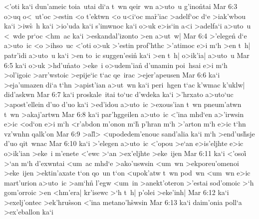 <'oti
ka`i
dun'ameic
toia~utai
di`a
t~wn
qeir~wn
a>uto~u
g'ino\r{n}tai\bibvsend
{}
\vs Mar 6:3
o>uq
o<~ut'oc
>estin
<o
t'ektwn
<o
u<i`oc
ma\r{r}'iac
>adelf`oc
d`e
>iak'wbou
ka`i
>iw\r{s}~h
ka`i
>io'uda
ka`i
s'imwnoc
ka`i
o>uk
e>is`in
a<i
>adelfa`i
a>uto~u
<~wde
pr`oc
<hm~ac
ka`i
>eskandal'izonto
>en
a>ut~w|\bibvsend
\vs Mar 6:4
>'elegen\r{}
d`e
a>uto~ic
<o
>ihso~uc
<'oti
o>uk
>'estin
prof'hthc
>'atimoc
e>i
m`h
>en
t~h|
patr'idi
a>uto~u
ka`i
>en
to~ic
suggen'esi\r{n}
ka`i
>en
t~h|
o>ik'ia|
a>uto~u\bibvsend
\vs Mar 6:5
ka`i
o>uk
>hd'u\r{n}ato
>eke~i
o>udem'ian\r{}
d'unamin
poi~hsai
e>i
m`h
>ol'igoic
>arr'wstoic
>epije`ic
t`ac
qe~irac
>ejer'apeusen\bibvsend
\vs Mar 6:6
ka`i
>eja'umazen
di`a
t`hn
>apist'ian
a>ut~wn
ka`i
peri~hgen
t`ac
k'wmac
k'uklw|
did'askwn\bibvsend
\vs Mar 6:7
ka`i
proskale~itai
to`uc
d'wdeka
ka`i
>'hrxato
a>uto`uc
>apost'ellein
d'uo
d'uo
ka`i
>ed'idou
a>uto~ic
>exous'ian
t~wn
pneum'atwn
t~wn
>akaj'artwn\bibvsend
\vs Mar 6:8
ka`i
par'hggeilen
a>uto~ic
<'ina
mhd`en
a>'irwsin
e>ic
<od`on
e>i
m`h
<r'abdon
m'onon
m`h\r{}
p'hran
m`h
>'arton
m`h
e>ic
t`hn
vz'wnhn
qalk'on\bibvsend
\vs Mar 6:9
>al\r{l}>
<upodedem'enouc
sand'alia
ka`i
m`h
>end'us\r{h}sje
d'uo
qit~wnac\bibvsend
\vs Mar 6:10
ka`i
>'elegen
a>uto~ic
<'opou
>e`an
e>is'eljhte
e>ic
o>ik'ian
>eke~i
m'enete
<'ewc
>`an
>ex'eljhte
>eke~ijen\bibvsend
\vs Mar 6:11
ka`i
<'osoi\r{}
>`an
m`h
d'exwntai
<um~ac
mhd`e
>ako'uswsin
<um~wn
>ekporeu'omenoi
>eke~ijen
>ektin'axate
t`on
qo~un
t`on
<upok'atw
t~wn
pod~wn
<um~wn
e>ic
mart'urion
a>uto~ic
>am`hn\r{}
l'egw
<um~in
>anekt'oteron
>'estai
sod'omoic
>`h
gom'orroic
>en
<hm'era|
kr'isewc
>`h
t~h|
p'olei
>eke'inh|\bibvsend
\vs Mar 6:12
ka`i
>exelj'ontec
>ek'hru\r{s}son
<'ina
metano'h\r{s}wsin\bibvsend
{}
\vs Mar 6:13
ka`i
daim'onia
poll`a
>ex'eballon
ka`i
